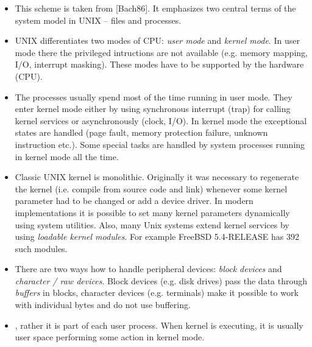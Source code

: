 \begin{itemize}
\item This scheme is taken from [Bach86]. It emphasizes two central terms
of the system model in UNIX -- files and processes.
\item UNIX differentiates two modes of CPU: \emph{user mode} and
\emph{kernel mode}. In user mode there the privileged intructions are not
available (e.g. memory mapping, I/O, interrupt masking). These modes have to
be supported by the hardware (CPU).
\item The processes usually spend most of the time running in user mode.
They enter kernel mode either by using synchronous interrupt (trap) for
calling kernel services or asynchronously (clock, I/O). In kernel mode
the exceptional states are handled (page fault, memory protection failure,
unknown instruction etc.). Some special tasks are handled by system processes
running in kernel mode all the time.
\item Classic UNIX kernel is monolithic. Originally it was necessary to
regenerate the kernel (i.e. compile from source code and link) whenever some
kernel parameter had to be changed or add a device driver. In modern
implementations it is possible to set many kernel parameters dynamically using
system utilities. Also, many Unix systems extend kernel services by using
\emph{loadable kernel modules}. For example FreeBSD 5.4-RELEASE has 392 such
modules.
\item There are two ways how to handle peripheral devices:
\emph{block devices} and \emph{character / raw devices}. Block devices (e.g.
disk drives) pass the data through \emph{buffers} in blocks, character devices
(e.g. terminals) make it possible to work with individual bytes and do not use
buffering.
\item {}, rather it is part of each
user process. When kernel is executing, it is usually user space performing some
action in kernel mode.
\end{itemize}



